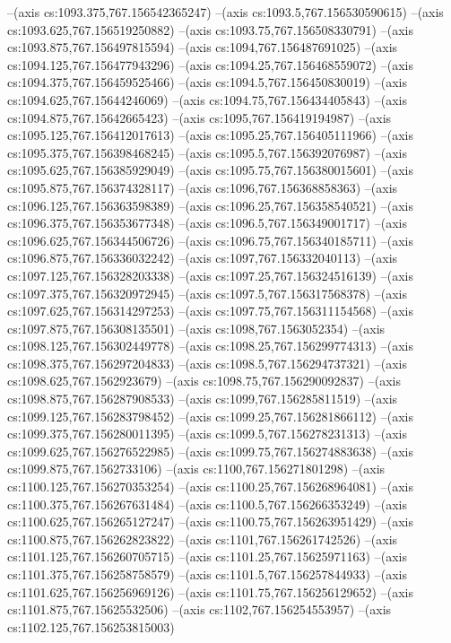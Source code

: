 --(axis cs:1093.375,767.156542365247)
--(axis cs:1093.5,767.156530590615)
--(axis cs:1093.625,767.156519250882)
--(axis cs:1093.75,767.156508330791)
--(axis cs:1093.875,767.156497815594)
--(axis cs:1094,767.156487691025)
--(axis cs:1094.125,767.156477943296)
--(axis cs:1094.25,767.156468559072)
--(axis cs:1094.375,767.156459525466)
--(axis cs:1094.5,767.156450830019)
--(axis cs:1094.625,767.15644246069)
--(axis cs:1094.75,767.156434405843)
--(axis cs:1094.875,767.15642665423)
--(axis cs:1095,767.156419194987)
--(axis cs:1095.125,767.156412017613)
--(axis cs:1095.25,767.156405111966)
--(axis cs:1095.375,767.156398468245)
--(axis cs:1095.5,767.156392076987)
--(axis cs:1095.625,767.156385929049)
--(axis cs:1095.75,767.156380015601)
--(axis cs:1095.875,767.156374328117)
--(axis cs:1096,767.156368858363)
--(axis cs:1096.125,767.156363598389)
--(axis cs:1096.25,767.156358540521)
--(axis cs:1096.375,767.156353677348)
--(axis cs:1096.5,767.156349001717)
--(axis cs:1096.625,767.156344506726)
--(axis cs:1096.75,767.156340185711)
--(axis cs:1096.875,767.156336032242)
--(axis cs:1097,767.156332040113)
--(axis cs:1097.125,767.156328203338)
--(axis cs:1097.25,767.156324516139)
--(axis cs:1097.375,767.156320972945)
--(axis cs:1097.5,767.156317568378)
--(axis cs:1097.625,767.156314297253)
--(axis cs:1097.75,767.156311154568)
--(axis cs:1097.875,767.156308135501)
--(axis cs:1098,767.1563052354)
--(axis cs:1098.125,767.156302449778)
--(axis cs:1098.25,767.156299774313)
--(axis cs:1098.375,767.156297204833)
--(axis cs:1098.5,767.156294737321)
--(axis cs:1098.625,767.1562923679)
--(axis cs:1098.75,767.156290092837)
--(axis cs:1098.875,767.156287908533)
--(axis cs:1099,767.156285811519)
--(axis cs:1099.125,767.156283798452)
--(axis cs:1099.25,767.156281866112)
--(axis cs:1099.375,767.156280011395)
--(axis cs:1099.5,767.156278231313)
--(axis cs:1099.625,767.156276522985)
--(axis cs:1099.75,767.156274883638)
--(axis cs:1099.875,767.1562733106)
--(axis cs:1100,767.156271801298)
--(axis cs:1100.125,767.156270353254)
--(axis cs:1100.25,767.156268964081)
--(axis cs:1100.375,767.156267631484)
--(axis cs:1100.5,767.156266353249)
--(axis cs:1100.625,767.156265127247)
--(axis cs:1100.75,767.156263951429)
--(axis cs:1100.875,767.156262823822)
--(axis cs:1101,767.156261742526)
--(axis cs:1101.125,767.156260705715)
--(axis cs:1101.25,767.15625971163)
--(axis cs:1101.375,767.156258758579)
--(axis cs:1101.5,767.156257844933)
--(axis cs:1101.625,767.156256969126)
--(axis cs:1101.75,767.156256129652)
--(axis cs:1101.875,767.15625532506)
--(axis cs:1102,767.156254553957)
--(axis cs:1102.125,767.156253815003)
